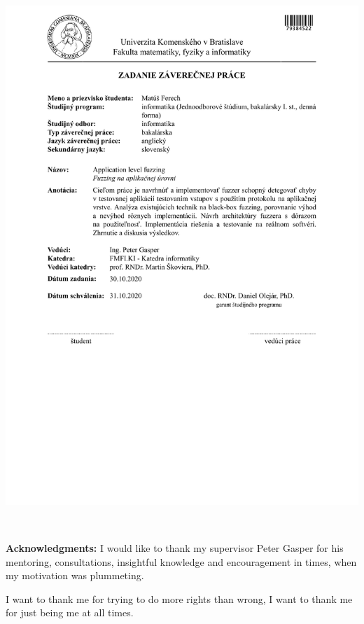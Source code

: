 \documentclass[12pt, twoside]{book}
\begin{document}
\hspace{-2cm}\includegraphics[width=1.1\textwidth]{images/assignment-sk}


\frontmatter

\setcounter{page}{3}
\newpage
~

\vfill
{\bf Acknowledgments:} I would like to thank my supervisor Peter Gasper for his mentoring, consultations, insightful knowledge and encouragement in times, when my motivation was plummeting.

I want to thank me for trying to do more rights than wrong, I want to thank me for just being me at all times.


\newpage
\end{document}

